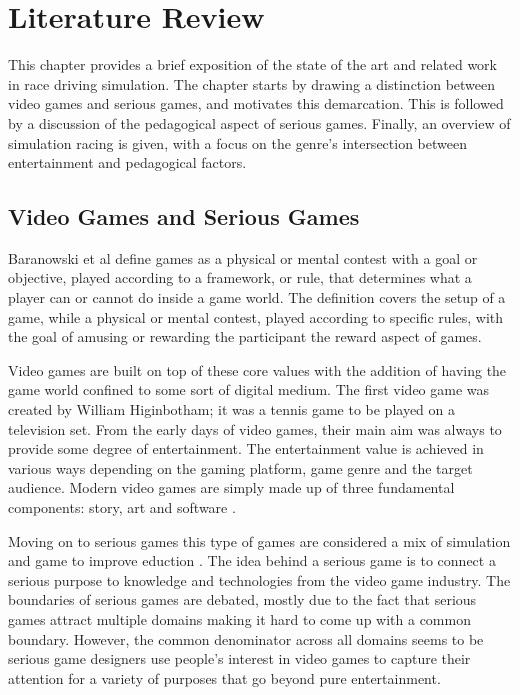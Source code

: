 \chapter{Literature Review}

This chapter provides a brief exposition of the state of the art and related work in race driving simulation. The chapter starts by drawing a distinction between video games and serious games, and motivates this demarcation. This is followed by a discussion of the pedagogical aspect of serious games. Finally, an overview of simulation racing is given, with a focus on the genre's intersection between entertainment and pedagogical factors.

\section{Video Games and Serious Games}
Baranowski et al \cite{yuserious} define games as a physical or mental contest with a goal or objective, played according to a framework, or rule, that determines what a player can or cannot do inside a game world. The definition covers the setup of a game, while a physical or mental contest, played according to specific rules, with the goal of amusing or rewarding the participant the reward aspect of games.

Video games are built on top of these core values with the addition of having the game world confined to some sort of digital medium. The first video game was created by William Higinbotham; it was a tennis game to be played on a television set\cite{stanton2015brief}. From the early days of video games, their main aim was always to provide some degree of entertainment. The entertainment value is achieved in various ways depending on the gaming platform, game genre and the target audience. Modern video games are simply made up of three fundamental components: story, art and software \cite{zyda2005visual}.

Moving on to serious games this type of games are considered a mix of simulation and game to improve eduction \cite{abt1970}. The idea behind a serious game is to connect a serious purpose to knowledge and technologies from the video game industry\cite{michael2005serious}. The boundaries of serious games are debated, mostly due to the fact that serious games attract multiple domains making it hard to come up with a common boundary. However, the common denominator across all domains seems to be serious game designers use people's interest in video games to capture their attention for a variety of purposes that go beyond pure entertainment\cite{djaouti2011classifying}.

